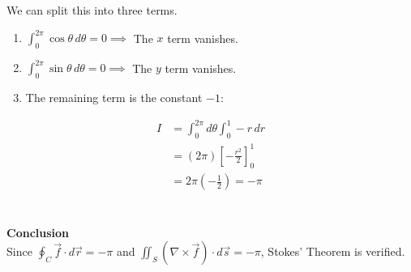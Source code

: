 \documentclass{article}
\begin{document}
We can split this into three terms.
\begin{enumerate}
	\item $\int_0^{2\pi} \cos\theta \, d\theta = 0 \implies$ The $x$ term vanishes.
	\item $\int_0^{2\pi} \sin\theta \, d\theta = 0 \implies$ The $y$ term vanishes.
	\item The remaining term is the constant $-1$:
\end{enumerate}
\begin{align*}
	I & = \int_0^{2\pi} d\theta \int_0^1 -r \, dr  \\
	  & = (2\pi) \left[ -\frac{r^2}{2} \right]_0^1 \\
	  & = 2\pi \left( -\frac{1}{2} \right) = -\pi
\end{align*}
\\
\\
\textbf{Conclusion}
\\
Since $\oint_C \vec{f} \cdot d\vec{r} = -\pi$ and
$\iint_S (\nabla \times \vec{f}) \cdot d\vec{s} = -\pi$, Stokes' Theorem is
verified.

\pagebreak

\end{document}
